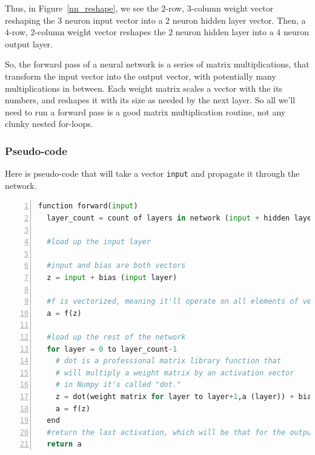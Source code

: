 \documentclass[12pt]{article}
\begin{document}
Thus, in Figure~\ref{nn_reshape}, we see the $2$-row, $3$-column weight vector reshaping the $3$ neuron input vector into a $2$ neuron hidden layer vector. Then, a $4$-row, $2$-column weight vector reshapes the $2$ neuron hidden layer into a $4$ neuron output layer.

So,  the forward pass of a neural network is a series of matrix multiplications, that transform the input vector into the output vector, with potentially many multiplications in between. Each weight matrix scales a vector with the its numbers, and reshapes it with its size as needed by the next layer. So all we'll need to run a forward pass is a good matrix multiplication routine, not any clunky nested for-loops.


\subsubsection{Pseudo-code}

Here is pseudo-code that will take a vector {\tt input} and propagate it through the network.

\begin{lstlisting}[language=Python,
		basicstyle=\small\ttfamily,
                 numbers=left,
                 stepnumber=1,
                 numbersep=8pt,
                 tabsize=2,
                 showspaces=false,
                 breaklines=true,
                 showstringspaces=false,
                 columns=fullflexible]
function forward(input)
  layer_count = count of layers in network (input + hidden layers + output)
    
  #load up the input layer
  
  #input and bias are both vectors
  z = input + bias (input layer)
  
  #f is vectorized, meaning it'll operate on all elements of vector z
  a = f(z)
    
  #load up the rest of the network
  for layer = 0 to layer_count-1
    # dot is a professional matrix library function that 
    # will multiply a weight matrix by an activation vector
    # in Numpy it's called "dot."
    z = dot(weight matrix for layer to layer+1,a (layer)) + bias (layer+1)
    a = f(z)
  end
  #return the last activation, which will be that for the output layer
  return a
\end{lstlisting}
\end{document}
